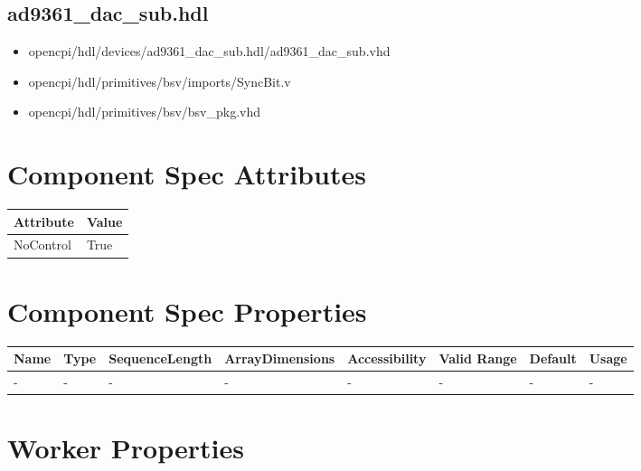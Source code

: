 \documentclass{article}
\def\comp{ad9361\_dac\_sub}
\begin{document}
\subsection*{\comp.hdl}
\begin{itemize}
	\item opencpi/hdl/devices/ad9361\_dac\_sub.hdl/ad9361\_dac\_sub.vhd
	\item opencpi/hdl/primitives/bsv/imports/SyncBit.v
	\item opencpi/hdl/primitives/bsv/bsv\_pkg.vhd
\end{itemize}
\begin{landscape}

	\section*{Component Spec Attributes}
	\begin{scriptsize}
		\begin{tabular}{|p{3.75cm}|p{19.34cm}|}
			\hline
			\rowcolor{blue}
			Attribute & Value \\
			\hline
			NoControl & True \\
			\hline
		\end{tabular}
	\end{scriptsize}
	
	\section*{Component Spec Properties}
	\begin{scriptsize}
		\begin{tabular}{|p{3.75cm}|p{1.25cm}|p{2cm}|p{2.75cm}|p{1.5cm}|p{1.5cm}|p{1cm}|p{6.74cm}|}
			\hline
			\rowcolor{blue}
			Name               & Type & SequenceLength & ArrayDimensions & Accessibility      & Valid Range & Default & Usage                                                                               \\
			\hline
			- & - & - & - & - & - & - & - \\
			\hline
		\end{tabular}
	\end{scriptsize}

	\section*{Worker Properties}

\end{landscape}
\end{document}
